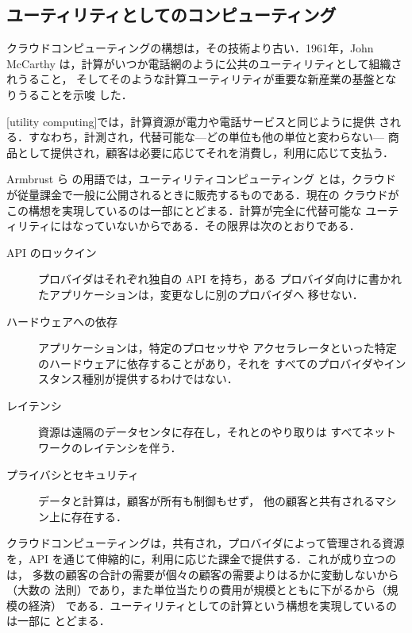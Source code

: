 \documentclass[../main.tex]{subfiles}
\begin{document}
\subsection{ユーティリティとしてのコンピューティング}

クラウドコンピューティングの構想は，その技術より古い．1961年，John McCarthy
は，計算がいつか電話網のように公共のユーティリティとして組織されうること，
そしてそのような計算ユーティリティが重要な新産業の基盤となりうることを示唆
した．

\begin{definition}[ユーティリティコンピューティング]
  [utility computing]では，計算資源が電力や電話サービスと同じように提供
  される．すなわち，計測され，代替可能な---どの単位も他の単位と変わらない---%
  商品として提供され，顧客は必要に応じてそれを消費し，利用に応じて支払う．
\end{definition}

Armbrust ら \cite{armbrust2009} の用語では，ユーティリティコンピューティング
とは，クラウドが従量課金で一般に公開されるときに販売するものである．現在の
クラウドがこの構想を実現しているのは一部にとどまる．計算が完全に代替可能な
ユーティリティにはなっていないからである．その限界は次のとおりである．
\begin{description}
  \item[API のロックイン] プロバイダはそれぞれ独自の API を持ち，ある
    プロバイダ向けに書かれたアプリケーションは，変更なしに別のプロバイダへ
    移せない．
  \item[ハードウェアへの依存] アプリケーションは，特定のプロセッサや
    アクセラレータといった特定のハードウェアに依存することがあり，それを
    すべてのプロバイダやインスタンス種別が提供するわけではない．
  \item[レイテンシ] 資源は遠隔のデータセンタに存在し，それとのやり取りは
    すべてネットワークのレイテンシを伴う．
  \item[プライバシとセキュリティ] データと計算は，顧客が所有も制御もせず，
    他の顧客と共有されるマシン上に存在する．
\end{description}

\begin{keypoint}
  クラウドコンピューティングは，共有され，プロバイダによって管理される資源
  を，API を通じて伸縮的に，利用に応じた課金で提供する．これが成り立つのは，
  多数の顧客の合計の需要が個々の顧客の需要よりはるかに変動しないから（大数の
  法則）であり，また単位当たりの費用が規模とともに下がるから（規模の経済）
  である．ユーティリティとしての計算という構想を実現しているのは一部に
  とどまる．
\end{keypoint}
\end{document}
